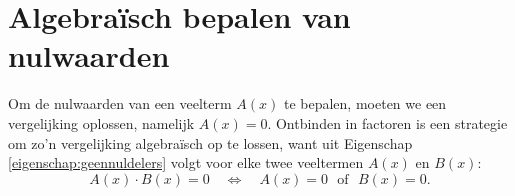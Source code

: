 \documentclass{ximera}
\begin{document}
	\author{Koen de Naeghel - Wiskunde Op Maat}
    \xmsource







	\section{Algebraïsch bepalen van nulwaarden} 

	Om de nulwaarden van een veelterm $A(x)$ te bepalen, moeten we een vergelijking oplossen, namelijk $A(x) = 0$. Ontbinden in factoren is een strategie om zo'n vergelijking algebraïsch op te lossen, want 
	uit Eigenschap \ref{eigenschap:geennuldelers} volgt voor elke twee veeltermen $A(x)$ en $B(x)$:
	\[
	A(x) \cdot B(x) = 0 \quad \Leftrightarrow \quad A(x) = 0 \,\, \text{ of } \,\, B(x)=0. 
	\]  
	
\end{document}
